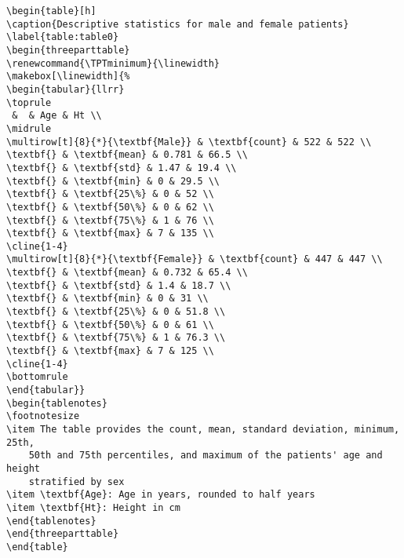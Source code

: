 \documentclass[11pt]{article}
\begin{document}
\begin{Verbatim}[tabsize=4]
\begin{table}[h]
\caption{Descriptive statistics for male and female patients}
\label{table:table0}
\begin{threeparttable}
\renewcommand{\TPTminimum}{\linewidth}
\makebox[\linewidth]{%
\begin{tabular}{llrr}
\toprule
 &  & Age & Ht \\
\midrule
\multirow[t]{8}{*}{\textbf{Male}} & \textbf{count} & 522 & 522 \\
\textbf{} & \textbf{mean} & 0.781 & 66.5 \\
\textbf{} & \textbf{std} & 1.47 & 19.4 \\
\textbf{} & \textbf{min} & 0 & 29.5 \\
\textbf{} & \textbf{25\%} & 0 & 52 \\
\textbf{} & \textbf{50\%} & 0 & 62 \\
\textbf{} & \textbf{75\%} & 1 & 76 \\
\textbf{} & \textbf{max} & 7 & 135 \\
\cline{1-4}
\multirow[t]{8}{*}{\textbf{Female}} & \textbf{count} & 447 & 447 \\
\textbf{} & \textbf{mean} & 0.732 & 65.4 \\
\textbf{} & \textbf{std} & 1.4 & 18.7 \\
\textbf{} & \textbf{min} & 0 & 31 \\
\textbf{} & \textbf{25\%} & 0 & 51.8 \\
\textbf{} & \textbf{50\%} & 0 & 61 \\
\textbf{} & \textbf{75\%} & 1 & 76.3 \\
\textbf{} & \textbf{max} & 7 & 125 \\
\cline{1-4}
\bottomrule
\end{tabular}}
\begin{tablenotes}
\footnotesize
\item The table provides the count, mean, standard deviation, minimum, 25th,
	50th and 75th percentiles, and maximum of the patients' age and height
	stratified by sex
\item \textbf{Age}: Age in years, rounded to half years
\item \textbf{Ht}: Height in cm
\end{tablenotes}
\end{threeparttable}
\end{table}

\end{Verbatim}
\end{document}
